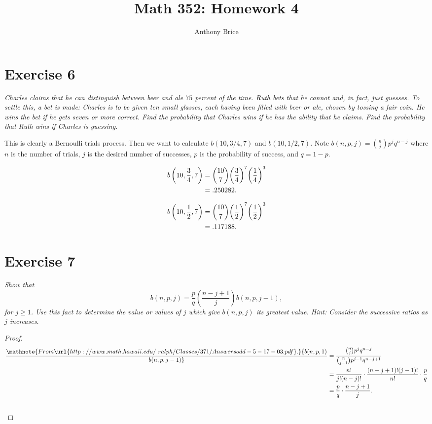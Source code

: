 \documentclass{abrice}
\title{Math 352: Homework 4}
\author{Anthony Brice}
\begin{document}
\maketitle

\section{Exercise 6}

\emph{Charles claims that he can distinguish between beer and ale $75$
  percent of the time.  Ruth bets that he cannot and, in fact, just
  guesses.  To settle this, a bet is made: Charles is to be given ten
  small glasses, each having been filled with beer or ale, chosen by
  tossing a fair coin.  He wins the bet if he gets seven or more
  correct.  Find the probability that Charles wins if he has the
  ability that he claims.  Find the probability that Ruth wins if
  Charles is guessing.}

\bigskip

This is clearly a Bernoulli trials process. Then we want to calculate
$b(10,3/4,7)$ and $b(10,1/2,7)$. Note
$ b(n,p,j) = {n \choose j} p^j q^{n - j}$ where $n$ is the number of
trials, $j$ is the desired number of successes, $p$ is the probability
of success, and $q = 1 - p$.

\begin{align*}
  b\left(10,{3 \over 4},7\right)
  &= {10 \choose 7} {\left( 3 \over 4 \right)}^7 {\left( 1 \over 4
    \right)}^3\\
  &= .250282.
\end{align*}

\begin{align*}
  b \left(10, {1 \over 2}, 7 \right)
  &= {10 \choose 7} {\left( 1 \over 2 \right)}^7 {\left( 1 \over 2
    \right)}^3\\
  &= .117188.
\end{align*}

\section{Exercise 7}

\emph{Show that
  \[
  b(n,p,j) = \frac pq \left(\frac {n - j + 1}j \right) b(n,p,j - 1),
  \]
  for $j \ge 1$. Use this fact to determine the value or values of
  $j$ which give $b(n,p,j)$ its greatest value.  \emph{Hint}: Consider
  the successive ratios as $j$ increases.}

\bigskip

\begin{proof}
  \begin{align*}\mathnote{From \url{http://www.math.hawaii.edu/~ralph/Classes/371/Answersodd-5-17-03.pdf}.}
    {b(n,p,1) \over b(n,p,j-1)}
    &= { {n \choose j} p^j q^{n-j} \over {n \choose j -1} p^{j - 1}
      q^{n - j + 1}}\\
    &= {n! \over j!(n-j)!} \cdot {(n-j + 1)! (j - 1)! \over n!}
      \cdot {p\over q}\\
    &= {p \over q} \cdot {n - j + 1 \over j}.\\
    & \qedhere
  \end{align*}
\end{proof}
\end{document}
